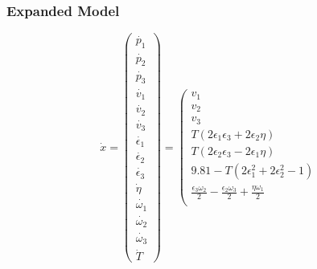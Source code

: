 \documentclass{beamer}
\begin{document}


\begin{frame}
    \frametitle{Expanded Model}
    \begin{equation}
        \dot{x}=\left(\begin{array}{c}
                \dot{p_{1}}        \\
                \dot{p_{2}}        \\
                \dot{p_{3}}        \\
                \dot{v_{1}}        \\
                \dot{v_{2}}        \\
                \dot{v_{3}}        \\
                \dot{\epsilon_{1}} \\
                \dot{\epsilon_{2}} \\
                \dot{\epsilon_{3}} \\
                \dot{\eta}         \\
                \dot{\omega_{1}}   \\
                \dot{\omega_{2}}   \\
                \dot{\omega_{3}}   \\
                \dot{T}
            \end{array}\right)=\left(\begin{array}{c}
                v_{1}                                                                                                  \\
                v_{2}                                                                                                  \\
                v_{3}                                                                                                  \\
                T\left(2 \epsilon_{1} \epsilon_{3}+2 \epsilon_{2} \eta\right)                                          \\
                T\left(2 \epsilon_{2} \epsilon_{3}-2 \epsilon_{1} \eta\right)                                          \\
                9.81-T\left(2 \epsilon_{1}^{2}+2 \epsilon_{2}^{2}-1\right)                                             \\
                \frac{\epsilon_{3} \omega_{2}}{2}-\frac{\epsilon_{2} \omega_{3}}{2}+\frac{\eta \omega_{1}}{2}          \\

\end{array}
\end{equation}
\end{frame}
\end{document}
